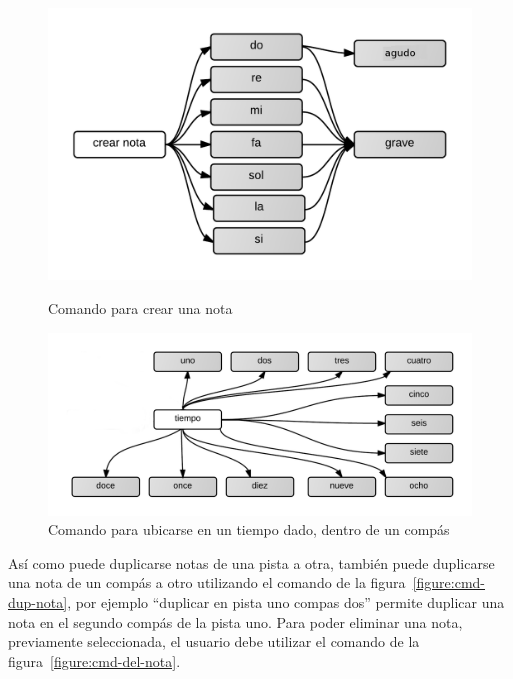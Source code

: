 \begin{figure}[H]
\begin{minipage}[b]{0.5\linewidth}
\centering
\includegraphics[width=1\linewidth]{./graphics/cmd-crear-nota.png}
\caption{Comando para crear una nota}
\label{figure:cmd-crear-nota}
\end{minipage}
\quad
\begin{minipage}[b]{0.5\linewidth}
\centering
\includegraphics[width=1.1\linewidth]{./graphics/cmd-tiempo-compas.png}
\caption{Comando para ubicarse en un tiempo dado, dentro de un comp\'as}
\label{figure:cmd-tiempo-compas}
\end{minipage}
\end{figure}

As\'i como puede duplicarse notas de una pista a otra, tambi\'en puede duplicarse una nota de un comp\'as a otro utilizando el comando
de la figura~\ref{figure:cmd-dup-nota}, por ejemplo ``duplicar en pista uno compas dos'' permite duplicar una nota en el segundo comp\'as de la pista 
uno. Para poder eliminar una nota, previamente seleccionada, el usuario debe utilizar el comando
de la figura~\ref{figure:cmd-del-nota}.

